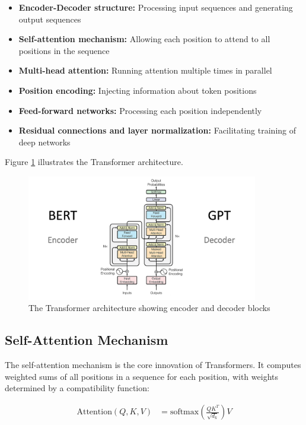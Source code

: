 \documentclass[11pt,a4paper]{report}
\begin{document}
\begin{itemize}
    \item \textbf{Encoder-Decoder structure:} Processing input sequences and generating output sequences
    \item \textbf{Self-attention mechanism:} Allowing each position to attend to all positions in the sequence
    \item \textbf{Multi-head attention:} Running attention multiple times in parallel
    \item \textbf{Position encoding:} Injecting information about token positions
    \item \textbf{Feed-forward networks:} Processing each position independently
    \item \textbf{Residual connections and layer normalization:} Facilitating training of deep networks
\end{itemize}

Figure \ref{fig:transformer-architecture} illustrates the Transformer architecture.

\begin{figure}[ht]
    \centering
    \includegraphics[width=0.9\textwidth]{transformer_architecture.png}
    \caption{The Transformer architecture showing encoder and decoder blocks}
    \label{fig:transformer-architecture}
\end{figure}

\subsection{Self-Attention Mechanism}
The self-attention mechanism is the core innovation of Transformers. It computes weighted sums of all positions in a sequence for each position, with weights determined by a compatibility function:

\begin{align}
\text{Attention}(Q, K, V) &= \text{softmax}\left(\frac{QK^T}{\sqrt{d_k}}\right)V \\
\end{align}
\end{document}
